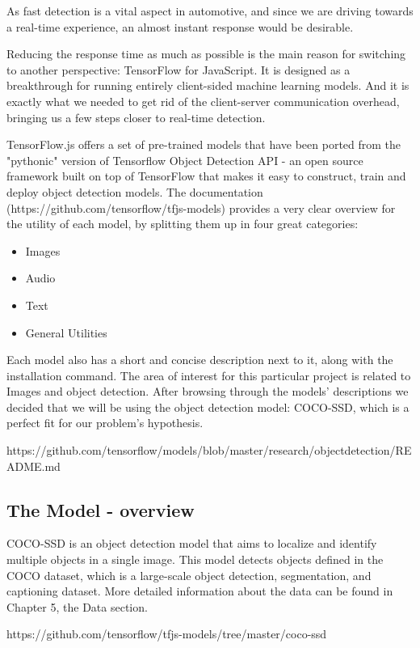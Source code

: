 \documentclass[runningheads,a4paper,11pt]{report}
\begin{document}
As fast detection is a vital aspect in automotive, and since we are driving towards a real-time experience, an almost instant response would be desirable. 

Reducing the response time as much as possible is the main reason for switching to another perspective: TensorFlow for JavaScript. It is designed as a breakthrough for running entirely client-sided machine learning models. And it is exactly what we needed to get rid of the client-server communication overhead, bringing us a few steps closer to real-time detection. 

TensorFlow.js offers a set of pre-trained models that have been ported from the "pythonic" version of Tensorflow Object Detection API - an open source framework built on top of TensorFlow that makes it easy to construct, train and deploy object detection models. The documentation (https://github.com/tensorflow/tfjs-models) provides a very clear overview for the utility of each model, by splitting them up in four great categories: 
\begin{itemize}
  \item Images
  \item Audio
  \item Text
  \item General Utilities
\end{itemize}
Each model also has a short and concise description next to it, along with the installation command. The area of interest for this particular project is related to Images and object detection. After browsing through the models' descriptions we decided that we will be using the object detection model: COCO-SSD, which is a perfect fit for our problem's hypothesis. 

https://github.com/tensorflow/models/blob/master/research/object\textunderscore detection/README.md


\subsection{The Model - overview}
\label{section:theModelOverview}

COCO-SSD is an object detection model that aims to localize and identify multiple objects in a single image. This model detects objects defined in the COCO dataset, which is a large-scale object detection, segmentation, and captioning dataset. More detailed information about the data can be found in Chapter 5, the Data section. 

https://github.com/tensorflow/tfjs-models/tree/master/coco-ssd
\end{document}
